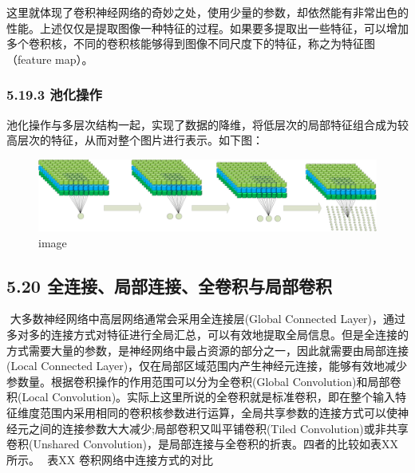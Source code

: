 这里就体现了卷积神经网络的奇妙之处，使用少量的参数，却依然能有非常出色的性能。上述仅仅是提取图像一种特征的过程。如果要多提取出一些特征，可以增加多个卷积核，不同的卷积核能够得到图像不同尺度下的特征，称之为特征图（feature
map）。

\subsubsection{5.19.3 池化操作}\label{ux6c60ux5316ux64cdux4f5c}

池化操作与多层次结构一起，实现了数据的降维，将低层次的局部特征组合成为较高层次的特征，从而对整个图片进行表示。如下图：

\begin{figure}
\centering
\includegraphics{./img/ch5/5.27.3.png}
\caption{image}
\end{figure}

\subsection{5.20
全连接、局部连接、全卷积与局部卷积}\label{ux5168ux8fdeux63a5ux5c40ux90e8ux8fdeux63a5ux5168ux5377ux79efux4e0eux5c40ux90e8ux5377ux79ef}

​ 大多数神经网络中高层网络通常会采用全连接层(Global Connected
Layer)，通过多对多的连接方式对特征进行全局汇总，可以有效地提取全局信息。但是全连接的方式需要大量的参数，是神经网络中最占资源的部分之一，因此就需要由局部连接(Local
Connected
Layer)，仅在局部区域范围内产生神经元连接，能够有效地减少参数量。根据卷积操作的作用范围可以分为全卷积(Global
Convolution)和局部卷积(Local
Convolution)。实际上这里所说的全卷积就是标准卷积，即在整个输入特征维度范围内采用相同的卷积核参数进行运算，全局共享参数的连接方式可以使神经元之间的连接参数大大减少;局部卷积又叫平铺卷积(Tiled
Convolution)或非共享卷积(Unshared
Convolution)，是局部连接与全卷积的折衷。四者的比较如表XX所示。 ​ 表XX
卷积网络中连接方式的对比

